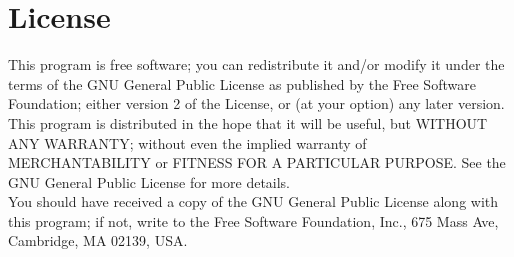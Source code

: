 \hypertarget{License}{
\section{License}
\label{License}
}
This program is free software; you can redistribute it and/or modify
it under the terms of the GNU General Public License as published by
the Free Software Foundation; either version 2 of the License, or
(at your option) any later version.\\
This program is distributed in the hope that it will be useful,
but WITHOUT ANY WARRANTY; without even the implied warranty of
MERCHANTABILITY or FITNESS FOR A PARTICULAR PURPOSE.  See the
GNU General Public License for more details.\\
You should have received a copy of the GNU General Public License
along with this program; if not, write to the Free Software
Foundation, Inc., 675 Mass Ave, Cambridge, MA 02139, USA.
    